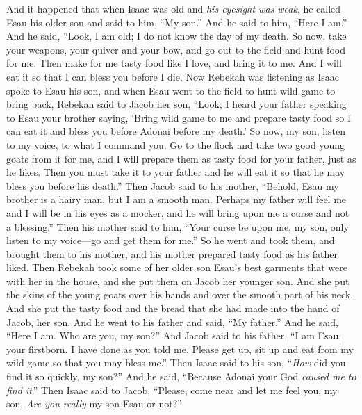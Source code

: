 \begin{biblechapter} %
 And it happened that when Isaac was old and \textit{his eyesight was weak}, he called Esau his older son and said to him, “My son.” And he said to him, “Here I am.”
\verse And he said, “Look, I am old; I do not know the day of my death.
\verse So now, take your weapons, your quiver and your bow, and go out to the field and hunt food for me.
\verse Then make for me tasty food like I love, and bring it to me. And I will eat it so that I can bless you before I die.
\verse Now Rebekah was listening as Isaac spoke to Esau his son, and when Esau went to the field to hunt wild game to bring back,
\verse Rebekah said to Jacob her son, “Look, I heard your father speaking to Esau your brother saying,
\verse ‘Bring wild game to me and prepare tasty food so I can eat it and bless you before Adonai before my death.’
\verse So now, my son, listen to my voice, to what I command you.
\verse Go to the flock and take two good young goats from it for me, and I will prepare them as tasty food for your father, just as he likes.
\verse Then you must take it to your father and he will eat it so that he may bless you before his death.”
\verse Then Jacob said to his mother, “Behold, Esau my brother is a hairy man, but I am a smooth man.
\verse Perhaps my father will feel me and I will be in his eyes as a mocker, and he will bring upon me a curse and not a blessing.”
\verse Then his mother said to him, “Your curse be upon me, my son, only listen to my voice—go and get them for me.”
\verse So he went and took them, and brought them to his mother, and his mother prepared tasty food as his father liked.
\verse Then Rebekah took some of her older son Esau’s best garments that were with her in the house, and she put them on Jacob her younger son.
\verse And she put the skins of the young goats over his hands and over the smooth part of his neck.
\verse And she put the tasty food and the bread that she had made into the hand of Jacob, her son.
\verse And he went to his father and said, “My father.” And he said, “Here I am. Who are you, my son?”
\verse And Jacob said to his father, “I am Esau, your firstborn. I have done as you told me. Please get up, sit up and eat from my wild game so that you may bless me.”
\verse Then Isaac said to his son, “\textit{How} did you find it so quickly, my son?” And he said, “Because Adonai your God \textit{caused me to find it}.”
\verse Then Isaac said to Jacob, “Please, come near and let me feel you, my son. \textit{Are you really} my son Esau or not?”

\end{biblechapter}
